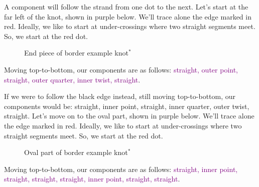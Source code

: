 \documentclass[openany]{book}
\newcommand{\gen}{\hyperref[generated]{$^*$}}%
\newcommand{\bk}{border example knot}
\begin{document}
A component will follow the strand from one dot to the next. Let's start at the far left of the knot, shown in purple below. We'll trace alone the edge marked in red. Ideally, we like to start at under-crossings where two straight segments meet. So, we start at the red dot.

\begin{figure}[H]\centering
{}
\caption{End piece of \bk\gen}
\end{figure}
Moving top-to-bottom, our components are as follows: \textcolor{purple}{straight, outer point, straight, outer quarter, inner twist, straight}.

If we were to follow the black edge instead, still moving top-to-bottom, our components would be: straight, inner point, straight, inner quarter, outer twist, straight.
Let's move on to the oval part, shown in purple below. We'll trace alone the edge marked in red. Ideally, we like to start at under-crossings where two straight segments meet. So, we start at the red dot.

\begin{figure}[H]\centering
{}
\caption{Oval part of \bk\gen}
\end{figure}
Moving top-to-bottom, our components are as follows: \textcolor{purple}{straight, inner point, straight, straight, straight, inner point, straight, straight}.
\end{document}
